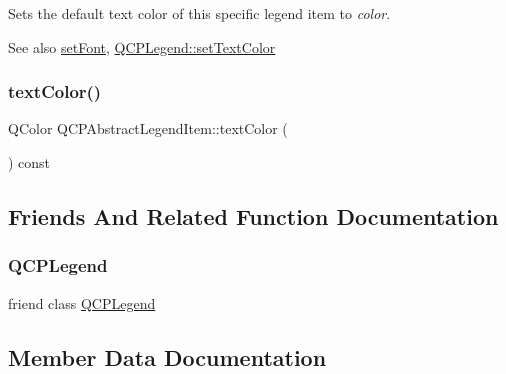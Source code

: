 Sets the default text color of this specific legend item to {\itshape color}.

\begin{DoxySeeAlso}{See also}
\mbox{\hyperlink{class_q_c_p_abstract_legend_item_a409c53455d8112f71d70c0c43eb10265}{set\+Font}}, \mbox{\hyperlink{class_q_c_p_legend_ae1eb239ff4a4632fe1b6c3e668d845c6}{Q\+C\+P\+Legend\+::set\+Text\+Color}} 
\end{DoxySeeAlso}
\mbox{\label{class_q_c_p_abstract_legend_item_a35b35fa697dcece86cf7e5818c0820b2}} 
\subsubsection{\texorpdfstring{textColor()}{textColor()}}
{\footnotesize\ttfamily Q\+Color Q\+C\+P\+Abstract\+Legend\+Item\+::text\+Color (\begin{DoxyParamCaption}{ }\end{DoxyParamCaption}) const\hspace{0.3cm}{\ttfamily [inline]}}



\subsection{Friends And Related Function Documentation}
\mbox{\label{class_q_c_p_abstract_legend_item_a8429035e7adfbd7f05805a6530ad5e3b}} 
\subsubsection{\texorpdfstring{QCPLegend}{QCPLegend}}
{\footnotesize\ttfamily friend class \mbox{\hyperlink{class_q_c_p_legend}{Q\+C\+P\+Legend}}\hspace{0.3cm}{\ttfamily [friend]}}



\subsection{Member Data Documentation}
\mbox{\label{class_q_c_p_abstract_legend_item_ae916a78ac0d2a60e20a17ca2f24f9754}} 
